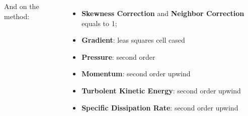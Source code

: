 \documentclass[english,10pt,a4paper,twoside]{beamer}
\begin{document}
\begin{frame}[shrink=22]
\begin{columns}[T]
		And on the method:
		\begin{itemize}
			\item \textbf{Skewness Correction} and \textbf{Neighbor Correction} equals to 1;
			\item \textbf{Gradient}: leas squares cell cased
			\item \textbf{Pressure}: second order
			\item \textbf{Momentum}: second order upwind
			\item \textbf{Turbolent Kinetic Energy}: second order upwind
			\item \textbf{Specific Dissipation Rate}: second order upwind
		\end{itemize}
	\end{columns}	
	\end{frame}
	
\end{document}
